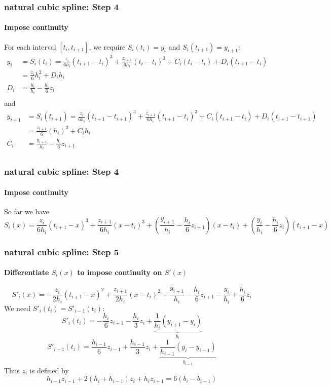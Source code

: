 \documentclass[10pt]{beamer}
\begin{document}
\begin{frame}
\frametitle{natural cubic spline: Step 4}
\framesubtitle{Impose continuity}
For each interval $[t_i,t_{i+1}]$, we require $S_i(t_i)=y_i$ and
$S_i(t_{i+1})=y_{i+1}$:
\begin{align*}
  y_i & = S_i(t_i) = \frac{z_i}{6h_i}(t_{i+1}-t_i)^3
+\frac{z_{i+1}}{6h_i}(t_i-t_i)^3 + C_i(t_i-t_i) + D_i(t_{i+1}-t_i)\\
      & = \frac{z_i}{6}h_i^2 + D_i h_i\\
  D_i & = \frac{y_i}{h_i} - \frac{h_i}{6}z_i\\
\end{align*}
and
\begin{align*}
  y_{i+1} & = S_i(t_{i+1}) = \frac{z_i}{6h_i}(t_{i+1}-t_{i+1})^3
+\frac{z_{i+1}}{6h_i}(t_{i+1}-t_i)^3 + C_i(t_{i+1}-t_i) + D_i(t_{i+1}-t_{i+1})\\
  & = \frac{z_{i+1}}{6}(h_i)^2 + C_ih_i\\
  C_i & = \frac{y_{i+1}}{h_i} - \frac{h_i}{6}z_{i+1}\\
\end{align*}
\end{frame}
\begin{frame}
\frametitle{natural cubic spline: Step 4}
\framesubtitle{Impose continuity}
So far we have
\begin{equation*}
  S_i(x) = \frac{z_i}{6h_i}(t_{i+1}-x)^3
+\frac{z_{i+1}}{6h_i}(x-t_i)^3 
+\left(\frac{y_{i+1}}{h_i} - \frac{h_i}{6}z_{i+1}\right)(x-t_i)
+\left(\frac{y_i}{h_i} - \frac{h_i}{6}z_i\right) (t_{i+1}-x)
\end{equation*}
\end{frame}
\begin{frame}
\frametitle{natural cubic spline: Step 5}
\framesubtitle{Differentiate $S_i(x)$ to impose continuity on $S'(x)$}
\begin{equation*}
  S'_i(x) = -\frac{z_i}{2h_i}(t_{i+1}-x)^2
+\frac{z_{i+1}}{2h_i}(x-t_i)^2 
+\frac{y_{i+1}}{h_i} - \frac{h_i}{6}z_{i+1}
-\frac{y_i}{h_i} + \frac{h_i}{6}z_i
\end{equation*}
We need $S'_i(t_i) = S'_{i-1}(t_i)$:
\begin{equation*}
  S'_i(t_i) = -\frac{h_i}{6}z_{i+1}
              -\frac{h_i}{3}z_i
              +\underbrace{\frac{1}{h_i}(y_{i+1}-y_i)}_{b_i}
\end{equation*}
\begin{equation*}
  S'_{i-1}(t_i) = \frac{h_{i-1}}{6}z_{i-1}
              +\frac{h_{i-1}}{3}z_i
              +\underbrace{\frac{1}{h_{i-1}}(y_{i}-y_{i-1})}_{b_{i-1}}
\end{equation*}
Thus $z_i$ is defined by
\begin{equation*}
  h_{i-1}z_{i-1} + 2(h_i+h_{i-1})z_i + h_{i}z_{i+1} = 6(b_i-b_{i-1})
\end{equation*}
\end{frame}
\end{document}
